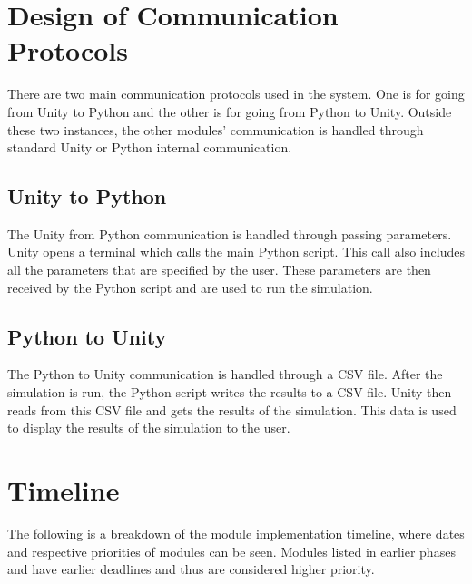 \documentclass[12pt, titlepage]{article}
\begin{document}
\noindent{}

\section{Design of Communication Protocols}
There are two main communication protocols used in the system.
One is for going from Unity to Python and the other is for going from Python to Unity.
Outside these two instances, the other modules' communication is handled through standard Unity or Python internal communication.

\subsection{Unity to Python}
The Unity from Python communication is handled through passing parameters.
Unity opens a terminal which calls the main Python script.
This call also includes all the parameters that are specified by the user.
These parameters are then received by the Python script and are used to run the simulation.

\subsection{Python to Unity}
The Python to Unity communication is handled through a CSV file.
After the simulation is run, the Python script writes the results to a CSV file.
Unity then reads from this CSV file and gets the results of the simulation.
This data is used to display the results of the simulation to the user.

\section{Timeline}

The following is a breakdown of the module implementation timeline, where dates and respective priorities of modules can be seen.
Modules listed in earlier phases and have earlier deadlines and thus are considered higher priority. 
\end{document}
